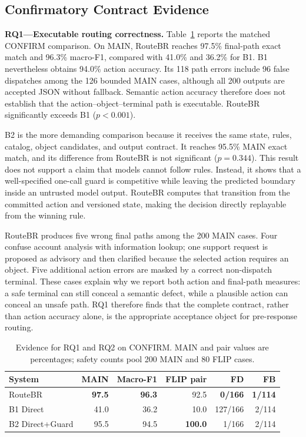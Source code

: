 \documentclass[10pt,conference,a4paper]{IEEEtran}
\newcommand{\method}{RouteBR}
\begin{document}
\subsection{Confirmatory Contract Evidence}

\noindent\textbf{RQ1---Executable routing correctness.}
Table~\ref{tab:main} reports the matched CONFIRM comparison. On MAIN, \method{} reaches 97.5\% final-path exact match and 96.3\% macro-F1, compared with 41.0\% and 36.2\% for B1. B1 nevertheless obtains 94.0\% action accuracy. Its 118 path errors include 96 false dispatches among the 126 bounded MAIN cases, although all 200 outputs are accepted JSON without fallback. Semantic action accuracy therefore does not establish that the action--object--terminal path is executable. \method{} significantly exceeds B1 ($p < 0.001$).

B2 is the more demanding comparison because it receives the same state, rules, catalog, object candidates, and output contract. It reaches 95.5\% MAIN exact match, and its difference from \method{} is not significant ($p = 0.344$). This result does not support a claim that models cannot follow rules. Instead, it shows that a well-specified one-call guard is competitive while leaving the predicted boundary inside an untrusted model output. \method{} computes that transition from the committed action and versioned state, making the decision directly replayable from the winning rule.

\method{} produces five wrong final paths among the 200 MAIN cases. Four confuse account analysis with information lookup; one support request is proposed as advisory and then clarified because the selected action requires an object. Five additional action errors are masked by a correct non-dispatch terminal. These cases explain why we report both action and final-path measures: a safe terminal can still conceal a semantic defect, while a plausible action can conceal an unsafe path. RQ1 therefore finds that the complete contract, rather than action accuracy alone, is the appropriate acceptance object for pre-response routing.

\begin{table}[!t]
\caption{Evidence for RQ1 and RQ2 on CONFIRM. MAIN and pair values are percentages; safety counts pool 200 MAIN and 80 FLIP cases.}
\label{tab:main}
\centering
\footnotesize
\setlength{\tabcolsep}{3.0pt}
\renewcommand{\arraystretch}{1.15}
\begin{tabular}{@{}lrrrrr@{}}
\toprule
System & MAIN & Macro-F1 & FLIP pair & FD & FB \\
\midrule
\method{} & \textbf{97.5} & \textbf{96.3} & 92.5 & \textbf{0/166} & \textbf{1/114} \\
B1 Direct & 41.0 & 36.2 & 10.0 & 127/166 & 2/114 \\
B2 Direct+Guard & 95.5 & 94.5 & \textbf{100.0} & 1/166 & 2/114 \\
\bottomrule
\end{tabular}
\end{table}
\end{document}
